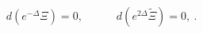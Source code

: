 \begin{equation}
  d\left( e^{-\Delta} \Xi \right) = 0 , \quad \quad \quad
d\left( e^{2\Delta} \tilde\Xi \right) = 0 , \label{dOmdtOm} \ .
\end{equation}

